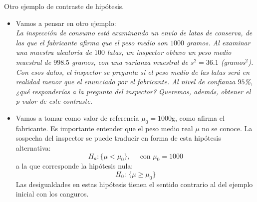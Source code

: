 \documentclass[
  9pt,
  ignorenonframetext,
]{beamer}
\begin{document}
\begin{frame}{Otro ejemplo de contraste de hipótesis.}
\protect\hypertarget{otro-ejemplo-de-contraste-de-hipotesis.}{}

\begin{itemize}
\item
  Vamos a pensar en otro ejemplo:\\
  \emph{La inspección de consumo está examinando un envío de latas de
  conserva, de las que el fabricante afirma que el peso medio son
  \(1000\) gramos. Al examinar una muestra aleatoria de \(100\) latas,
  un inspector obtuvo un peso medio muestral de \(998.5\) gramos, con
  una varianza muestral de \(s^2 = 36.1\) (gramos\(^2\)). Con esos
  datos, el inspector se pregunta si el peso medio de las latas será en
  realidad menor que el enunciado por el fabricante. Al nivel de
  confianza \(95\)\%, ¿qué responderías a la pregunta del inspector?
  Queremos, además, obtener el p-valor de este contraste.}
\item
  Vamos a tomar como valor de referencia \(\mu_0 = 1000\)g, como afirma
  el fabricante. Es importante entender que el peso medio real \(\mu\)
  no se conoce. La sospecha del inspector se puede traducir en forma de
  esta hipótesis alternativa:
  \[H_a:\{\mu < \mu_0\},\quad\text{ con }\mu_0 = 1000\] a la que
  corresponde la hipótesis nula: \[H_0:\,\{\mu \geq \mu_0\}\] Las
  desigualdades en estas hipótesis tienen el sentido contrario al del
  ejemplo inicial con los canguros.
\end{itemize}

\end{frame}
\end{document}
